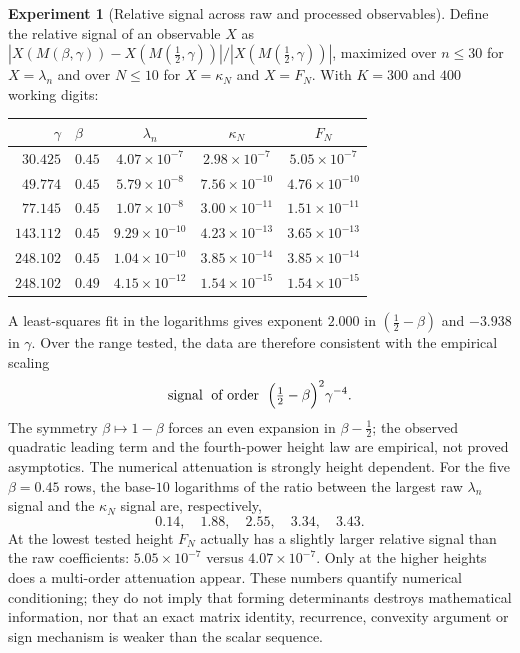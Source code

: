 \documentclass[11pt]{amsart}
\numberwithin{equation}{section}
\theoremstyle{plain}
\theoremstyle{definition}
\newtheorem{experiment}[theorem]{Experiment}
\theoremstyle{remark}
\begin{document}
\begin{experiment}[Relative signal across raw and processed observables]
\label{exp:signal_law}
Define the relative signal of an observable $X$ as
$|X(M(\beta,\gamma))-X(M(\tfrac12,\gamma))|/|X(M(\tfrac12,\gamma))|$, maximized over
$n\le30$ for $X=\lambda_n$ and over $N\le10$ for $X=\kappa_N$ and $X=F_N$.  With
$K=300$ and $400$ working digits:
\begin{center}
\small
\begin{tabular}{rlccc}
\toprule
$\gamma$ & $\beta$ & $\lambda_n$ & $\kappa_N$ & $F_N$\\
\midrule
$30.425$  & $0.45$ & $4.07\times10^{-7}$  & $2.98\times10^{-7}$  & $5.05\times10^{-7}$\\
$49.774$  & $0.45$ & $5.79\times10^{-8}$  & $7.56\times10^{-10}$ & $4.76\times10^{-10}$\\
$77.145$  & $0.45$ & $1.07\times10^{-8}$  & $3.00\times10^{-11}$ & $1.51\times10^{-11}$\\
$143.112$ & $0.45$ & $9.29\times10^{-10}$ & $4.23\times10^{-13}$ & $3.65\times10^{-13}$\\
$248.102$ & $0.45$ & $1.04\times10^{-10}$ & $3.85\times10^{-14}$ & $3.85\times10^{-14}$\\
$248.102$ & $0.49$ & $4.15\times10^{-12}$ & $1.54\times10^{-15}$ & $1.54\times10^{-15}$\\
\bottomrule
\end{tabular}
\end{center}
A least-squares fit in the logarithms gives exponent $2.000$ in $(\tfrac12-\beta)$ and
$-3.938$ in $\gamma$.  Over the range tested, the data are therefore consistent with the
empirical scaling
\begin{equation}
 \text{signal}\;\text{ of order }\;\Bigl(\tfrac12-\beta\Bigr)^2\gamma^{-4}.
 \label{eq:signal_law}
\end{equation}
The symmetry $\beta\mapsto1-\beta$ forces an even expansion in $\beta-\tfrac12$; the
observed quadratic leading term and the fourth-power height law are empirical, not proved
asymptotics.  The numerical attenuation is strongly height dependent.  For the five
$\beta=0.45$ rows, the base-$10$ logarithms of the ratio between the largest raw
$\lambda_n$ signal and the $\kappa_N$ signal are, respectively,
\begin{equation}
 0.14,\quad 1.88,\quad 2.55,\quad 3.34,\quad 3.43.
 \label{eq:signal_ratio_lambda_kappa}
\end{equation}
At the lowest tested height $F_N$ actually has a slightly larger relative signal than the
raw coefficients: $5.05\times10^{-7}$ versus $4.07\times10^{-7}$.  Only at the higher
heights does a multi-order attenuation appear.  These numbers quantify numerical
conditioning; they do not imply that forming determinants destroys mathematical
information, nor that an exact matrix identity, recurrence, convexity argument or sign
mechanism is weaker than the scalar sequence.
\end{experiment}
\end{document}
